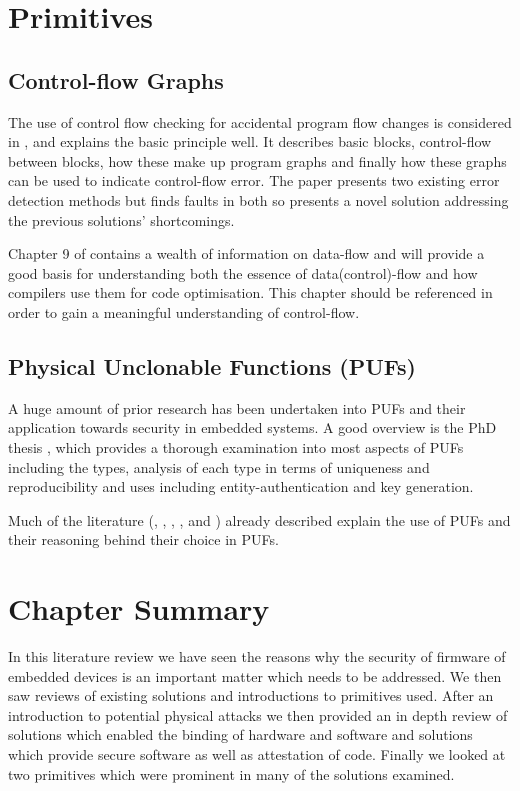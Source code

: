 \section{Primitives}

\subsection{Control-flow Graphs}

The use of control flow checking for accidental program flow changes is considered in \cite{Goloubeva2003}, and explains the basic principle well. It describes basic blocks, control-flow between blocks, how these make up program graphs and finally how these graphs can be used to indicate control-flow error. The paper presents two existing error detection methods but finds faults in both so presents a novel solution addressing the previous solutions' shortcomings.

Chapter 9 of \cite{AhoAlfredV.2014C:pt} contains a wealth of information on data-flow and will provide a good basis for understanding both the essence of data(control)-flow and how compilers use them for code optimisation. This chapter should be referenced in order to gain a meaningful understanding of control-flow.


\subsection{Physical Unclonable Functions (PUFs)}\label{PUFExplaination}

A huge amount of prior research has been undertaken into PUFs and their application towards security in embedded systems. A good overview is the PhD thesis \cite{Maes2012}, which provides a thorough examination into most aspects of PUFs including the types, analysis of each type in terms of uniqueness and reproducibility and uses including entity-authentication and key generation.

Much of the literature (\cite{Lee2016}, \cite{Schaller2014}, \cite{Kleber2015}, \cite{Kohnhauser2015}, \cite{Gora2010} and \cite{Simpson2006}) already described explain the use of PUFs and their reasoning behind their choice in PUFs.

\section{Chapter Summary}

In this literature review we have seen the reasons why the security of firmware of embedded devices is an important matter which needs to be addressed. We then saw reviews of existing solutions and introductions to primitives used. After an introduction to potential physical attacks we then provided an in depth review of solutions which enabled the binding of hardware and software and solutions which provide secure software as well as attestation of code. Finally we looked at two primitives which were prominent in many of the solutions examined.
